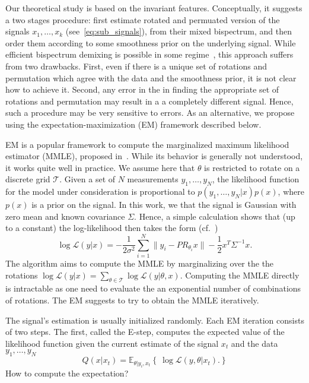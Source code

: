 \documentclass[english,12pt]{article}
\newcommand{\E}{\mathbb{E}}
\numberwithin{equation}{section}
\numberwithin{mytheorem}{section} %
\begin{document}
Our theoretical study is based on the invariant features. Conceptually, it suggests a two stages procedure: first estimate rotated and permuated version of the signals $x_1,\ldots,x_k$ (see~\eqref{eq:sub_signals}), from their mixed bispectrum, and then order them according to some smoothness prior on the underlying signal. While efficient bispectrum demixing is possible in some regime~\cite{boumal2018heterogeneous}, this approach suffers from two drawbacks. First, even if there is a unique set of rotations and permutation which agree with the data and the smoothness prior, it is not clear how to achieve it. Second, any error in the in finding the appropriate set of rotations and permutation may result in a a completely different signal. Hence, such a procedure may be very sensitive to errors. 
As an alternative, we propose using the expectation-maximization (EM) framework described below. 

EM is a popular  framework to compute the marginalized maximum likelihood estimator (MMLE), proposed in~\cite{dempster1977maximum}. While its behavior is generally not understood, it works quite well in practice. We assume here that $\theta$ is restricted to rotate on a discrete grid $\mathcal{T}$. Given a set of $N$ measurements $y_1,\ldots,y_N$, the likelihood function for the model under consideration is proportional to $p(y_1,\ldots,y_N|x)p(x)$, where $p(x)$ is a prior on the signal. In this work, we that the signal is Gaussian with zero mean and known covariance $\Sigma$.
Hence,  a simple calculation shows that (up to a constant) the log-likelihood   then takes the form (cf.~\cite{bendory2017bispectrum,abbe2018multireference})
\begin{equation}
\log \mathcal{L}(y|x)  = -\frac{1}{2\sigma^2}\sum_{i=1}^{N}\|y_i - PR_{\theta_i}x\| - \frac{1}{2}x^T\Sigma^{-1}x.
\end{equation}
The algorithm aims to compute the MMLE by marginalizing over the the rotations  $\log \mathcal{L}(y|x)  = \sum_{\theta\in\mathcal{T}}\log \mathcal{L}(y|\theta,x)$. Computing the MMLE directly is intractable as one need to evaluate the an exponential number of combinations of rotations. The EM suggests to try to obtain the MMLE iteratively. 

The signal's estimation is usually initialized randomly. 
Each EM iteration consists of two steps.
The first, called the E-step, computes the expected value of the likelihood function  given the current estimate of the signal $x_t$ and the data $y_1,\ldots,y_N$
\begin{equation}
Q(x|x_t) = \E_{\theta|y_i,x_t}\left\{\ \log \mathcal{L}(y,\theta|x_t).   \right\}
\end{equation} 
How to compute the expectation?
\end{document}

